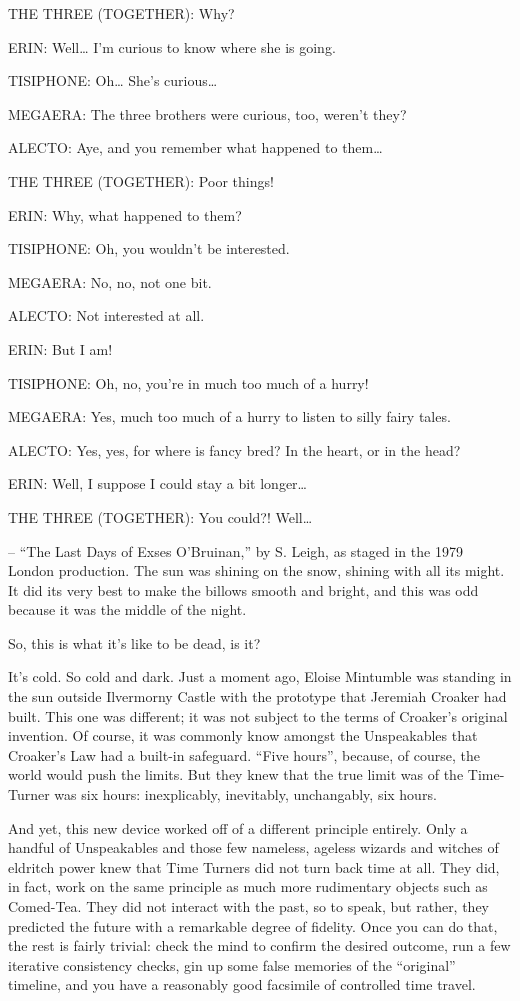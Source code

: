 THE THREE (TOGETHER): Why?

ERIN: Well… I’m curious to know where she is going.

TISIPHONE: Oh… She’s curious…

MEGAERA: The three brothers were curious, too, weren’t they?

ALECTO: Aye, and you remember what happened to them…

THE THREE (TOGETHER): Poor things!

ERIN: Why, what happened to them?

TISIPHONE: Oh, you wouldn’t be interested.

MEGAERA: No, no, not one bit.

ALECTO: Not interested at all.

ERIN: But I am!

TISIPHONE: Oh, no, you’re in much too much of a hurry!

MEGAERA: Yes, much too much of a hurry to listen to silly fairy tales.

ALECTO: Yes, yes, for where is fancy bred? In the heart, or in the head?

ERIN: Well, I suppose I could stay a bit longer…

THE THREE (TOGETHER): You could?! Well…

– “The Last Days of Exses O’Bruinan,” by S. Leigh, as staged in the 1979 London production.
\simpleline
{}
The sun was shining on the snow, shining with all its might. It did its very best to make the billows smooth and bright, and this was odd because it was the middle of the night.

So, this is what it’s like to be dead, is it?

It’s cold. So cold and dark. Just a moment ago, Eloise Mintumble was standing in the sun outside Ilvermorny Castle with the prototype that Jeremiah Croaker had built. This one was different; it was not subject to the terms of Croaker’s original invention. Of course, it was commonly know amongst the Unspeakables that Croaker’s Law had a built-in safeguard. “Five hours”, because, of course, the world would push the limits. But they knew that the true limit was of the Time-Turner was six hours: inexplicably, inevitably, unchangably, six hours.

And yet, this new device worked off of a different principle entirely. Only a handful of Unspeakables and those few nameless, ageless wizards and witches of eldritch power knew that Time Turners did not turn back time at all. They did, in fact, work on the same principle as much more rudimentary objects such as Comed-Tea. They did not interact with the past, so to speak, but rather, they predicted the future with a remarkable degree of fidelity. Once you can do that, the rest is fairly trivial: check the mind to confirm the desired outcome, run a few iterative consistency checks, gin up some false memories of the “original” timeline, and you have a reasonably good facsimile of controlled time travel.

